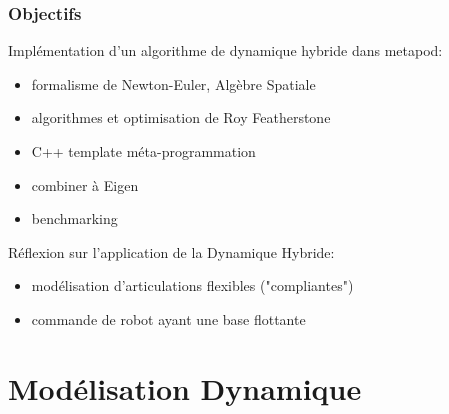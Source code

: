 \documentclass[10pt]{beamer}
\begin{document}
\begin{frame}
  \frametitle{Objectifs}
  
  \begin{block}{Implémentation d'un algorithme de dynamique hybride dans metapod:}
	\begin{itemize}
		\item formalisme de Newton-Euler, Algèbre Spatiale
		\item algorithmes et optimisation de Roy Featherstone
		\item C++ template méta-programmation
		\item combiner à Eigen 
		\item benchmarking
  \end{itemize}
  \end{block}
	
	\bigskip
  Réflexion sur l'application de la Dynamique Hybride:
  	\begin{itemize}
		\item modélisation d'articulations flexibles ("compliantes")
		\item commande de robot ayant une base flottante
  \end{itemize}
	
\end{frame}

\section{Modélisation Dynamique}

\subsection{}
\end{document}
